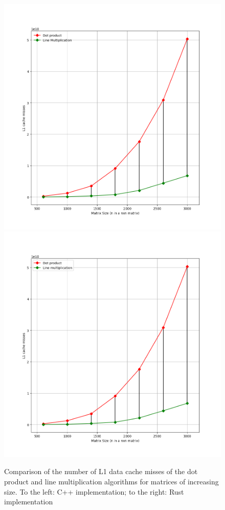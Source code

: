 \documentclass{report}
\begin{document}
				\begin{figure}[H]
					\begin{adjustbox}{center}
						\includegraphics[scale=0.4]{cpp_dot_line_l1.png}
						\includegraphics[scale=0.4]{rs_l1_misses.png}
					\end{adjustbox}
					\caption{Comparison of the number of L1 data cache misses of the dot product and line multiplication algorithms for matrices of increasing size. To the left: C++ implementation; to the right: Rust implementation}
				\end{figure}
			
\end{document}

